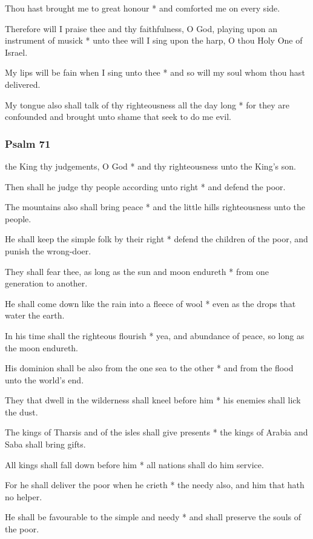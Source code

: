 Thou hast brought me to great honour * and comforted me on every side.

Therefore will I praise thee and thy faithfulness, O God, playing upon an instrument of musick * unto thee will I sing upon the harp, O thou Holy One of Israel.

My lips will be fain when I sing unto thee * and so will my soul whom thou hast delivered.

My tongue also shall talk of thy righteousness all the day long * for they are confounded and brought unto shame that seek to do me evil.

\subsubsection{Psalm 71}


 the King thy judgements, O God * and thy righteousness unto the King's son.

Then shall he judge thy people according unto right * and defend the poor.

The mountains also shall bring peace * and the little hills righteousness unto the people.

He shall keep the simple folk by their right * defend the children of the poor, and punish the wrong-doer.

They shall fear thee, as long as the sun and moon endureth * from one generation to another.

He shall come down like the rain into a fleece of wool * even as the drops that water the earth.

In his time shall the righteous flourish * yea, and abundance of peace, so long as the moon endureth.

His dominion shall be also from the one sea to the other * and from the flood unto the world's end.

They that dwell in the wilderness shall kneel before him * his enemies shall lick the dust.

The kings of Tharsis and of the isles shall give presents * the kings of Arabia and Saba shall bring gifts.

All kings shall fall down before him * all nations shall do him service.

For he shall deliver the poor when he crieth * the needy also, and him that hath no helper.

He shall be favourable to the simple and needy * and shall preserve the souls of the poor.

